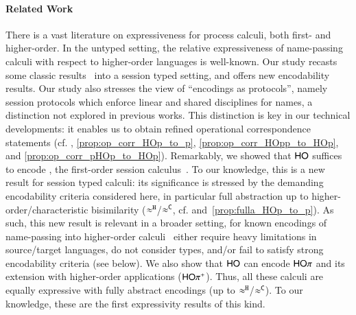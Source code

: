 \documentclass[runningheads]{llncs}
\begin{document}
{\paragraph{Related Work}
There is a vast literature on expressiveness for process calculi, both 
first- and higher-order. 
In the untyped setting, the relative expressiveness of name-passing calculi with respect to 
higher-order languages %
is well-known. 
Our study  recasts some classic results~\cite{SangiorgiD:expmpa} into a session typed setting, and
offers new encodability results.
Our study also stresses the 
view of ``encodings as protocols'', namely session protocols which
enforce  linear and shared disciplines for names, a distinction
not explored in %
previous works.
This distinction is key 
in our technical developments: %
it enables us to obtain 
 refined 
operational correspondence statements (cf. , \ref{prop:op_corr_HOp_to_p}, \ref{prop:op_corr_HOpp_to_HOp}, and \ref{prop:op_corr_pHOp_to_HOp}).
Remarkably, we showed that
$\mathsf{HO}$ suffices to encode \sessp,  the first-order session
calculus~\cite{honda.vasconcelos.kubo:language-primitives}. %
To our knowledge, this is a new result for session typed calculi: its significance is stressed by the demanding encodability criteria  considered here, in particular full abstraction up to higher-order/characteristic bisimilarity ($\approx^\mathtt{H}$/$\approx^\mathtt{C}$, cf.  and~\ref{prop:fulla_HOp_to_p}).
As such, this new result is relevant in a broader setting, for known encodings 
of name-passing into higher-order calculi~\cite{SaWabook,BundgaardHG06,DBLP:journals/entcs/MeredithR05,XuActa2012,DBLP:journals/corr/XuYL15} either require heavy limitations
in source/target languages,
do not consider types,
 and/or fail to satisfy strong encodability criteria (see below). 
We also show that $\mathsf{HO}$ can encode $\mathsf{HO}\pi$ and its extension with
higher-order applications ($\mathsf{HO\pi^{+}}$). 
Thus, %
all these  calculi are equally expressive with fully
abstract encodings (up to $\approx^\mathtt{H}$/$\approx^\mathtt{C}$).  
To our knowledge, these are the first expressivity results of this kind.

}
\end{document}
